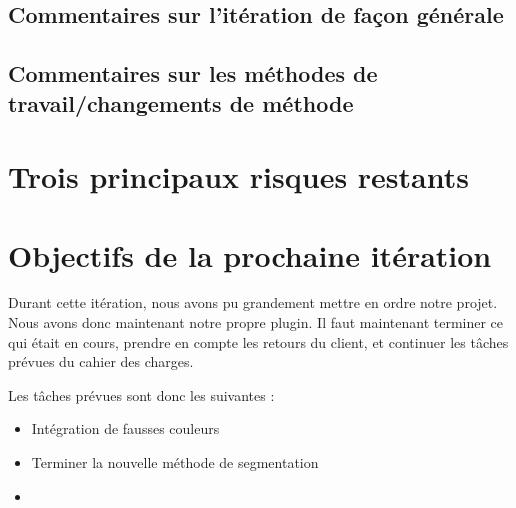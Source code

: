 \documentclass[12pt,titlepage,french]{article}
\begin{document}
\subsection{Commentaires sur l'itération de façon générale}

\subsection{Commentaires sur les méthodes de travail/changements de méthode}

\section{Trois principaux risques restants}


\section{Objectifs de la prochaine itération}

Durant cette itération, nous avons pu grandement mettre en ordre notre projet. Nous avons donc maintenant notre propre plugin. Il faut maintenant terminer ce qui était en cours, prendre en compte les retours du client, et continuer les tâches prévues du cahier des charges.

Les tâches prévues sont donc les suivantes :

\begin{itemize}
  \item Intégration de fausses couleurs
  \item Terminer la nouvelle méthode de segmentation
  \item
\end{itemize}
\end{document}
